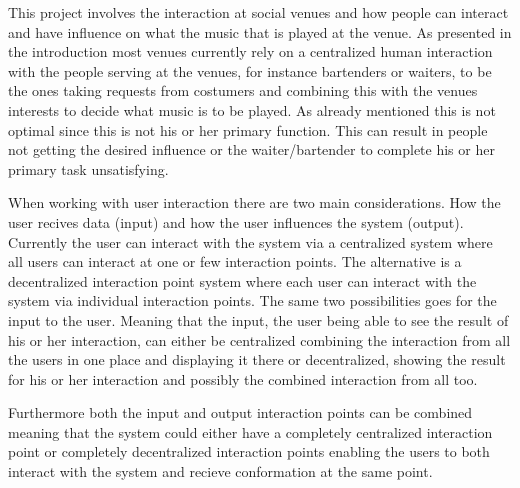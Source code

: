 This project involves the interaction at social venues and how people can interact and have influence on what the music that is played at the venue. As presented in the introduction most venues currently rely on a centralized human interaction with the people serving at the venues, for instance bartenders or waiters, to be the ones taking requests from costumers and combining this with the venues interests to decide what music is to be played. As already mentioned this is not optimal since this is not his or her primary function. This can result in people not getting the desired influence or the waiter/bartender to complete his or her primary task unsatisfying.

When working with user interaction there are two main considerations. How the user recives data (input) and how the user influences the system (output).
Currently the user can interact with the system via a centralized system where all users can interact at one or few interaction points. The alternative is a decentralized interaction point system where each user can interact with the system via individual interaction points.
The same two possibilities goes for the input to the user. Meaning that the input, the user being able to see the result of his or her interaction, can either be centralized combining the interaction from all the users in one place and displaying it there or decentralized, showing the result for his or her interaction and possibly the combined interaction from all too.

Furthermore both the input and output interaction points can be combined meaning that the system could either have a completely centralized interaction point or completely decentralized interaction points enabling the users to both interact with the system and recieve conformation at the same point.
